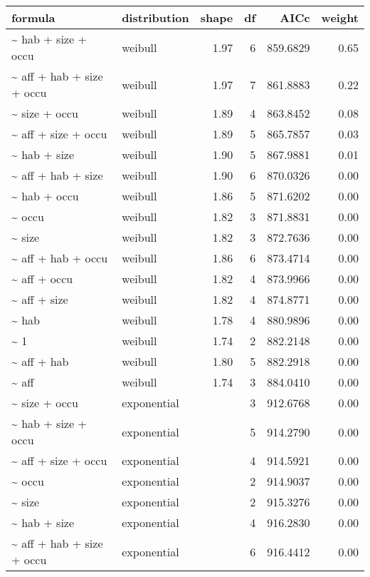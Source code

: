 \begin{table}[ht]
\centering
\begin{tabular}{llrrrr}
 formula & distribution & shape & df & AICc & weight \\ 
  \hline
\~{} hab + size + occu & weibull & 1.97 & 6 & 859.6829 & 0.65 \\ 
  \~{} aff + hab + size + occu & weibull & 1.97 & 7 & 861.8883 & 0.22 \\ 
  \~{} size + occu & weibull & 1.89 & 4 & 863.8452 & 0.08 \\ 
  \~{} aff + size + occu & weibull & 1.89 & 5 & 865.7857 & 0.03 \\ 
  \~{} hab + size & weibull & 1.90 & 5 & 867.9881 & 0.01 \\ 
  \~{} aff + hab + size & weibull & 1.90 & 6 & 870.0326 & 0.00 \\ 
  \~{} hab + occu & weibull & 1.86 & 5 & 871.6202 & 0.00 \\ 
  \~{} occu & weibull & 1.82 & 3 & 871.8831 & 0.00 \\ 
  \~{} size & weibull & 1.82 & 3 & 872.7636 & 0.00 \\ 
  \~{} aff + hab + occu & weibull & 1.86 & 6 & 873.4714 & 0.00 \\ 
  \~{} aff + occu & weibull & 1.82 & 4 & 873.9966 & 0.00 \\ 
  \~{} aff + size & weibull & 1.82 & 4 & 874.8771 & 0.00 \\ 
  \~{} hab & weibull & 1.78 & 4 & 880.9896 & 0.00 \\ 
  \~{} 1 & weibull & 1.74 & 2 & 882.2148 & 0.00 \\ 
  \~{} aff + hab & weibull & 1.80 & 5 & 882.2918 & 0.00 \\ 
  \~{} aff & weibull & 1.74 & 3 & 884.0410 & 0.00 \\ 
  \~{} size + occu & exponential &  & 3 & 912.6768 & 0.00 \\ 
  \~{} hab + size + occu & exponential &  & 5 & 914.2790 & 0.00 \\ 
  \~{} aff + size + occu & exponential &  & 4 & 914.5921 & 0.00 \\ 
  \~{} occu & exponential &  & 2 & 914.9037 & 0.00 \\ 
  \~{} size & exponential &  & 2 & 915.3276 & 0.00 \\ 
  \~{} hab + size & exponential &  & 4 & 916.2830 & 0.00 \\ 
  \~{} aff + hab + size + occu & exponential &  & 6 & 916.4412 & 0.00 \\ 

\end{tabular}
\end{table}
